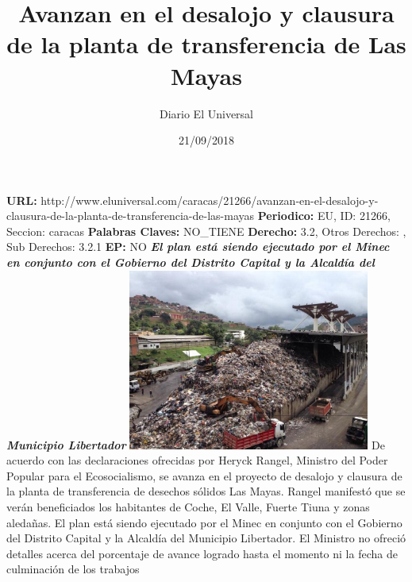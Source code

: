 \documentclass{article}%
\title{\textbf{Avanzan en el desalojo y clausura de la planta de transferencia de Las Mayas}}%
\author{Diario El Universal}%
\date{21/09/2018}%
\begin{document}
%
\normalsize%
\maketitle%
\textbf{URL: }%
http://www.eluniversal.com/caracas/21266/avanzan{-}en{-}el{-}desalojo{-}y{-}clausura{-}de{-}la{-}planta{-}de{-}transferencia{-}de{-}las{-}mayas\newline%
%
\textbf{Periodico: }%
EU, %
ID: %
21266, %
Seccion: %
caracas\newline%
%
\textbf{Palabras Claves: }%
NO\_TIENE\newline%
%
\textbf{Derecho: }%
3.2, %
Otros Derechos: %
, %
Sub Derechos: %
3.2.1\newline%
%
\textbf{EP: }%
NO\newline%
\newline%
%
\textbf{\textit{El plan está siendo ejecutado por el Minec en conjunto con el Gobierno del Distrito Capital y la Alcaldía del Municipio Libertador}}%
\newline%
\newline%
%
\includegraphics[width=300px]{129.jpg}%
\newline%
%
De acuerdo con las declaraciones ofrecidas por Heryck Rangel, Ministro del Poder Popular para el Ecosocialismo, se avanza en el proyecto de desalojo y clausura de la planta de transferencia de desechos sólidos Las Mayas.%
\newline%
%
Rangel manifestó que se verán beneficiados los habitantes de Coche, El Valle, Fuerte Tiuna y zonas aledañas.%
\newline%
%
El plan está siendo ejecutado por el Minec en conjunto con el Gobierno del Distrito Capital y la Alcaldía del Municipio Libertador.%
\newline%
%
El Ministro no ofreció detalles acerca del porcentaje de avance logrado hasta el momento ni la fecha de culminación de los trabajos%
\newline%
%
\end{document}
